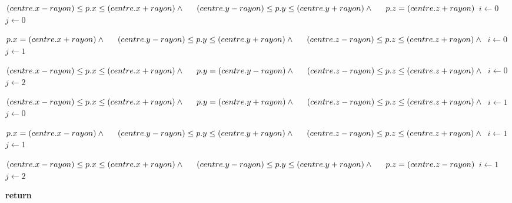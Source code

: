 \documentclass[12pt,addpoints]{exam}
\begin{document}
\begin{questions}
\begin{solution}
\begin{algorithmic}
	\If 
	{$
		(centre.x - rayon) \leq p.x \leq (centre.x + rayon) \land \newline
		\indent (centre.y - rayon) \leq p.y \leq (centre.y + rayon) \land \newline
		\indent p.z = (centre.z + rayon)
	$}
		\State $i \gets 0$
		\State $j \gets 0$
	\EndIf

	\If 
	{$
		p.x = (centre.x + rayon) \land \newline
		\indent (centre.y - rayon) \leq p.y \leq (centre.y + rayon) \land \newline
		\indent (centre.z - rayon) \leq p.z \leq (centre.z + rayon) \land \newline
		
	$}
		\State $i \gets 0$
		\State $j \gets 1$
	\EndIf

	\If 
	{$
		(centre.x - rayon) \leq p.x \leq (centre.x + rayon) \land \newline
		\indent p.y = (centre.y - rayon) \land \newline
		\indent (centre.z - rayon) \leq p.z \leq (centre.z + rayon) \land \newline
	$}
		\State $i \gets 0$
		\State $j \gets 2$
	\EndIf

	\If 
	{$
		(centre.x - rayon) \leq p.x \leq (centre.x + rayon) \land \newline
		\indent p.y = (centre.y + rayon) \land \newline
		\indent (centre.z - rayon) \leq p.z \leq (centre.z + rayon) \land \newline
	$}
		\State $i \gets 1$
		\State $j \gets 0$
	\EndIf

	\If 
	{$
		p.x = (centre.x - rayon) \land \newline
		\indent (centre.y - rayon) \leq p.y \leq (centre.y + rayon) \land \newline
		\indent (centre.z - rayon) \leq p.z \leq (centre.z + rayon) \land \newline
	$}
		\State $i \gets 1$
		\State $j \gets 1$
	\EndIf

	\If 
	{$
		(centre.x - rayon) \leq p.x \leq (centre.x + rayon) \land \newline
		\indent (centre.y - rayon) \leq p.y \leq (centre.y + rayon) \land \newline
		\indent p.z = (centre.z - rayon)
	$}
		\State $i \gets 1$
		\State $j \gets 2$
	\EndIf

	\State \textbf{return} 
	\EndFunction
	\end{algorithmic}
\end{solution}


\end{questions}
\end{document}
